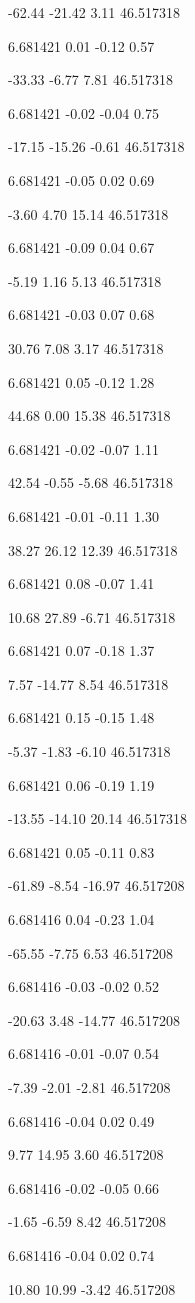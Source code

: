 -62.44
-21.42
3.11
46.517318

6.681421
0.01
-0.12
0.57

-33.33
-6.77
7.81
46.517318

6.681421
-0.02
-0.04
0.75

-17.15
-15.26
-0.61
46.517318

6.681421
-0.05
0.02
0.69

-3.60
4.70
15.14
46.517318

6.681421
-0.09
0.04
0.67

-5.19
1.16
5.13
46.517318

6.681421
-0.03
0.07
0.68

30.76
7.08
3.17
46.517318

6.681421
0.05
-0.12
1.28

44.68
0.00
15.38
46.517318

6.681421
-0.02
-0.07
1.11

42.54
-0.55
-5.68
46.517318

6.681421
-0.01
-0.11
1.30

38.27
26.12
12.39
46.517318

6.681421
0.08
-0.07
1.41

10.68
27.89
-6.71
46.517318

6.681421
0.07
-0.18
1.37

7.57
-14.77
8.54
46.517318

6.681421
0.15
-0.15
1.48

-5.37
-1.83
-6.10
46.517318

6.681421
0.06
-0.19
1.19

-13.55
-14.10
20.14
46.517318

6.681421
0.05
-0.11
0.83

-61.89
-8.54
-16.97
46.517208

6.681416
0.04
-0.23
1.04

-65.55
-7.75
6.53
46.517208

6.681416
-0.03
-0.02
0.52

-20.63
3.48
-14.77
46.517208

6.681416
-0.01
-0.07
0.54

-7.39
-2.01
-2.81
46.517208

6.681416
-0.04
0.02
0.49

9.77
14.95
3.60
46.517208

6.681416
-0.02
-0.05
0.66

-1.65
-6.59
8.42
46.517208

6.681416
-0.04
0.02
0.74

10.80
10.99
-3.42
46.517208

